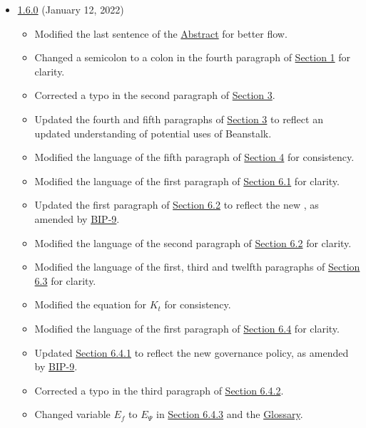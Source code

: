 \documentclass[class=article, crop=false]{standalone}
\begin{document}
\begin{itemize}[topsep=0pt, itemsep=3pt,leftmargin=16pt]
\begin{itemize}
    \end{itemize}
    \item \href{https://github.com/BeanstalkFarms/Beanstalk/blob/master/version-history/beanstalk1_6_0.pdf}{1.6.0} (January 12, 2022)
    \begin{itemize}
        \item Modified the last sentence of the \hyperlink{abstract}{Abstract} for better flow.
        \item Changed a semicolon to a colon in the fourth paragraph of \hyperlink{section.1}{Section 1} for clarity.
        \item Corrected a typo in the second paragraph of \hyperlink{section.3}{Section 3}.
        \item Updated the fourth and fifth paragraphs of \hyperlink{section.3}{Section 3} to reflect an updated understanding of potential uses of Beanstalk.
        \item Modified the language of the fifth paragraph of \hyperlink{section.4}{Section 4} for consistency.
        \item Modified the language of the first paragraph of \hyperlink{subsection.6.1}{Section 6.1} for clarity.
        \item Updated the first paragraph of \hyperlink{subsection.6.2}{Section 6.2} to reflect the new  , as amended by \href{https://github.com/BeanstalkFarms/Beanstalk-Governance-Proposals/blob/master/bip/bip-09-efficiency-improvements.md}{BIP-9}.
        \item Modified the language of the second paragraph of \hyperlink{subsection.6.2}{Section 6.2} for clarity.
        \item Modified the language of the first, third and twelfth paragraphs of \hyperlink{subsection.6.3}{Section 6.3} for clarity.
        \item Modified the equation for $K_t$ for consistency.
        \item Modified the language of the first paragraph of \hyperlink{subsection.6.4}{Section 6.4} for clarity.
        \item Updated \hyperlink{subsubsection.6.4.1}{Section 6.4.1} to reflect the new governance policy, as amended by \href{https://github.com/BeanstalkFarms/Beanstalk-Governance-Proposals/blob/master/bip/bip-09-efficiency-improvements.md}{BIP-9}.
        \item Corrected a typo in the third paragraph of \hyperlink{subsubsection.6.4.2}{Section 6.4.2}.
        \item Changed variable $E_f$ to $E_{\Psi}$ in \hyperlink{subsubsection.6.4.3}{Section 6.4.3} and the \hyperlink{subsection.14.11}{Glossary}.

\end{itemize}
\end{itemize}
\end{document}
